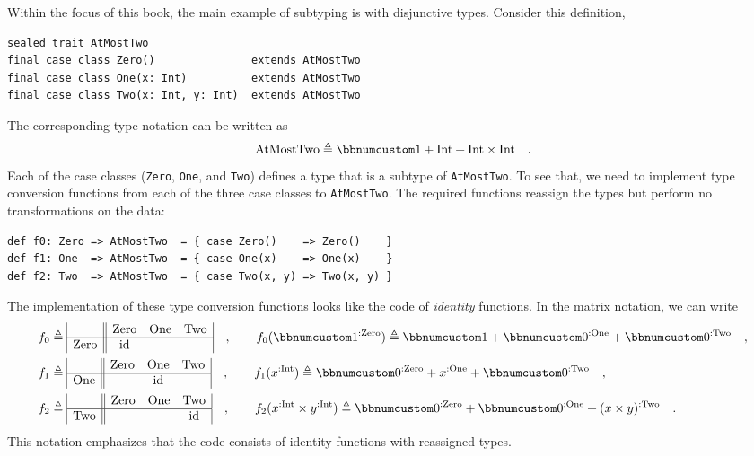 Within the focus of this book, the main example of subtyping is with
disjunctive types. Consider this definition,
\begin{lstlisting}
sealed trait AtMostTwo
final case class Zero()               extends AtMostTwo
final case class One(x: Int)          extends AtMostTwo
final case class Two(x: Int, y: Int)  extends AtMostTwo
\end{lstlisting}
The corresponding type notation can be written as
\[
\text{AtMostTwo}\triangleq\bbnum 1+\text{Int}+\text{Int}\times\text{Int}\quad.
\]
Each of the case classes (\lstinline!Zero!, \lstinline!One!, and
\lstinline!Two!) defines a type that is a subtype of \lstinline!AtMostTwo!.
To see that, we need to implement type conversion functions from each
of the three case classes to \lstinline!AtMostTwo!. The required
functions reassign the types but perform no transformations on the
data:
\begin{lstlisting}
def f0: Zero => AtMostTwo  = { case Zero()    => Zero()    }
def f1: One  => AtMostTwo  = { case One(x)    => One(x)    }
def f2: Two  => AtMostTwo  = { case Two(x, y) => Two(x, y) }
\end{lstlisting}
The implementation of these type conversion functions looks like the
code of \emph{identity} functions. In the matrix notation, we can
write
\begin{align*}
f_{0} & \triangleq\begin{array}{|c||ccc|}
 & \text{Zero} & \text{One} & \text{Two}\\
\hline \text{Zero} & \text{id} &  & 
\end{array}\quad,\quad\quad f_{0}(\bbnum 1^{:\text{Zero}})\triangleq\bbnum 1+\bbnum 0^{:\text{One}}+\bbnum 0^{:\text{Two}}\quad,\\
f_{1} & \triangleq\begin{array}{|c||ccc|}
 & \text{Zero} & \text{One} & \text{Two}\\
\hline \text{One} &  & \text{id} & 
\end{array}\quad,\quad\quad f_{1}(x^{:\text{Int}})\triangleq\bbnum 0^{:\text{Zero}}+x^{:\text{One}}+\bbnum 0^{:\text{Two}}\quad,\\
f_{2} & \triangleq\begin{array}{|c||ccc|}
 & \text{Zero} & \text{One} & \text{Two}\\
\hline \text{Two} &  &  & \text{id}
\end{array}\quad,\quad\quad f_{2}(x^{:\text{Int}}\times y^{:\text{Int}})\triangleq\bbnum 0^{:\text{Zero}}+\bbnum 0^{:\text{One}}+(x\times y)^{:\text{Two}}\quad.
\end{align*}
This notation emphasizes that the code consists of identity functions
with reassigned types.

